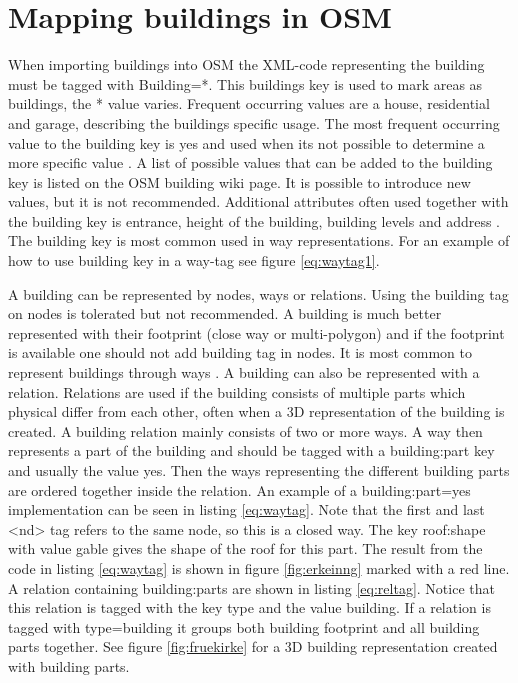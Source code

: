  \section{Mapping buildings in OSM}
When importing buildings into OSM the XML-code representing the building must be tagged with Building=*. This buildings key is used to mark areas as buildings, the * value varies. Frequent occurring values are a house, residential and garage, describing the buildings specific usage. The most frequent occurring value to the building key is yes and used when its not possible to determine a more specific value \cite{OpenStreetMapf}. A list of possible values that can be added to the building key is listed on the OSM building wiki page. It is possible to introduce new values, but it is not recommended. Additional attributes often used together with the building key is entrance, height of the building, building levels and address \cite{Unkn} . The building key is most common used in way representations. For an example of how to use building key in a way-tag see figure \ref{eq:waytag1}.

A building can be represented by nodes, ways or relations. Using the building tag on nodes is tolerated but not recommended. A building is much better represented with their footprint (close way or multi-polygon) and if the footprint is available one should not add building tag in nodes. It is most common to represent buildings through ways \cite{OpenStreetMapf}. A building can also be represented with a relation. Relations are used if the building consists of multiple parts which physical differ from each other, often when a 3D representation of the building is created. A building relation mainly consists of two or more ways. A way then represents a part of the building and should be tagged with a building:part key and usually the value yes. Then the ways representing the different building parts are ordered together inside the relation. An example of a building:part=yes implementation can be seen in listing \ref{eq:waytag}. Note that the first and last <nd> tag refers to the same node, so this is a closed way. The key roof:shape with value gable gives the shape of the roof for this part. The result from the code in listing \ref{eq:waytag} is shown in figure \ref{fig:erkeinng} marked with a red line. A relation containing building:parts are shown in listing \ref{eq:reltag}. Notice that this relation is tagged with the key type and the value building. If a relation is tagged with type=building it groups both building footprint and all building parts together. See figure \ref{fig:fruekirke} for a 3D building representation created with building parts. 


